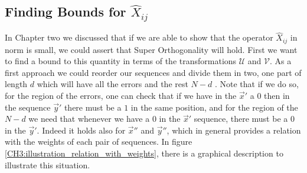 \subsection{Finding Bounds for $\hat{X}_{ij}$}

In Chapter two we discussed that if we are able to show that the operator $\hat{X}_{ij}$ in norm is small, we could assert that Super Orthogonality will hold. First we want to find a bound to this quantity in terms of the transformations $\mathcal{U}$ and $\mathcal{V}$. As a first approach we could reorder our sequences and divide them in two, one part of length $d$ which will have all the errors and the rest $N-d$ . Note that if we do so, for the region of the errors, one can check that if we have in the $\vec{x}'$ a $0$ then in the sequence $\vec{y}'$ there must be a $1$ in the same position, and for the region of the $N-d$ we need that whenever we have a $0$ in the $\vec{x}'$ sequence, there must be a $0$ in the $\vec{y}'$. Indeed it holds also for $\vec{x}''$ and $\vec{y}''$, which in general provides a relation with the weights of each pair of sequences. In figure \ref{CH3:illustration_relation_with_weights}, there is a graphical description to illustrate this situation.\\

